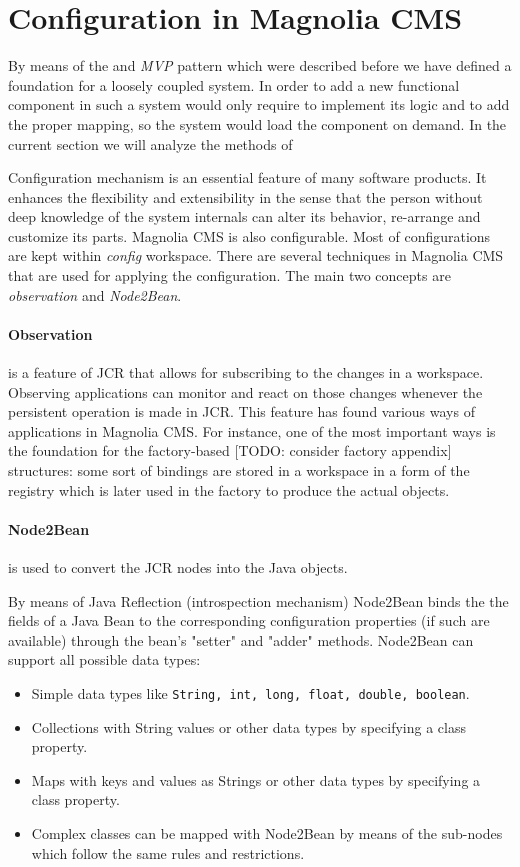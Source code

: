 \section{Configuration in Magnolia CMS}
By means of the  and \emph{MVP} pattern which were
described before we have defined a foundation for a loosely coupled system.
In order to add a new functional component in such a system would only require
to implement its logic and to add the proper mapping, so the system would load
the component on demand. In the current section we will analyze the methods of  

Configuration mechanism is an essential feature of many software products. It
enhances the flexibility and extensibility in the sense that the person without
deep knowledge of the system internals can alter its behavior, re-arrange and
customize its parts. Magnolia CMS is also configurable.
Most of configurations are kept within \emph{config} workspace. There are
several techniques in Magnolia CMS that are used for applying the configuration.
The main two concepts are \emph{observation} and \emph{Node2Bean}.

\paragraph{Observation} is a feature of JCR that allows for subscribing to the
changes in a workspace. Observing applications can monitor and react on those
changes whenever the persistent operation is made in JCR. This feature has found
various ways of applications in Magnolia CMS. For instance, one of the most
important ways is the foundation for the factory-based [TODO: consider factory
appendix] structures: some sort of bindings are stored in a workspace in a form
of the registry which is later used in the factory to produce the actual objects.

\paragraph{Node2Bean} is used to convert the JCR nodes into the Java objects. 

By means of Java Reflection (introspection mechanism) Node2Bean binds the the
fields of a Java Bean to the corresponding configuration properties (if such are
available) through the bean's "setter" and "adder" methods. Node2Bean can
support all possible data types:
\begin{itemize}
  \item Simple data types like \texttt{String, int, long, float, double, boolean}.
  \item Collections with String values or other data types by specifying a class property.
  \item Maps with keys and values as Strings or other data types by specifying a class property.
  \item Complex classes can be mapped with Node2Bean by means of the sub-nodes
  which follow the same rules and restrictions.
\end{itemize}

